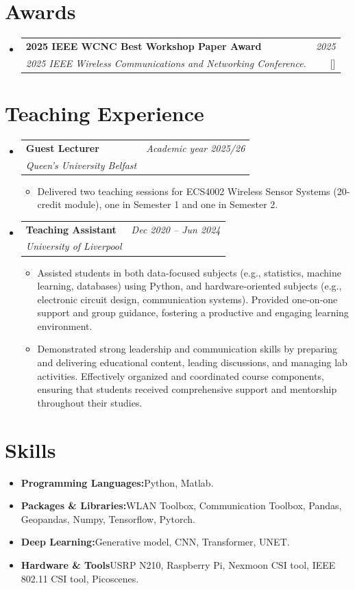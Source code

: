 \documentclass[a4paper,11pt]{article}
\makeatletter
\newcommand{\resumeItem}[2]{
  \item{
    \textbf{#1}{\hspace{0.5mm}#2 \vspace{-0.5mm}}
  }
}
\newcommand{\resumeProject}[4]{
\vspace{0.5mm}\item
    \begin{tabular*}{0.98\textwidth}[t]{l@{\extracolsep{\fill}}r}
        \textbf{#1} & \textit{\footnotesize{#3}} \\
        \footnotesize{\textit{#2}} & \footnotesize{#4}
    \end{tabular*}
    \vspace{-2.4mm}
}
\newcommand{\resumeSubItem}[2]{\resumeItem{#1}{#2}\vspace{-4pt}}
\newcommand{\resumeSubHeadingListStart}{\begin{itemize}[leftmargin=*,labelsep=1mm]}
\newcommand{\resumeHeadingSkillStart}{\begin{itemize}[leftmargin=*,itemsep=1.7mm, rightmargin=2ex]}
\newcommand{\resumeItemListStart}{\begin{itemize}[leftmargin=*,labelsep=1mm,itemsep=0.5mm]}
\newcommand{\resumeSubHeadingListEnd}{\end{itemize}\vspace{2mm}}
\newcommand{\resumeHeadingSkillEnd}{\end{itemize}\vspace{-2mm}}
\newcommand{\resumeItemListEnd}{\end{itemize}\vspace{-2mm}}
\makeatother
\begin{document}
\section{\textbf{Awards}}
\vspace{-0.8mm}
\resumeSubHeadingListStart
\resumeProject
  {2025 IEEE WCNC Best Workshop Paper Award}
  {2025 IEEE Wireless Communications and Networking Conference.}
  {2025}
  {{}[\href{https://wcnc2025.ieee-wcnc.org/program-0/program-glance/best-paper-awards}
  {\textcolor{darkblue}{\faIcon{globe}}}]
  }
\resumeSubHeadingListEnd


\section{\textbf{Teaching Experience}}
\resumeSubHeadingListStart
\resumeProject
  {Guest Lecturer}
  {Queen's University Belfast}
  {Academic year 2025/26}
  {}
\resumeItemListStart
\item Delivered two teaching sessions for ECS4002 Wireless Sensor Systems (20-credit module), one in Semester 1 and one in Semester 2.
\resumeItemListEnd

\resumeProject
  {Teaching Assistant}
  {University of Liverpool}
  {Dec 2020 -- Jun 2024}
  {}
\resumeItemListStart
\item Assisted students in both data-focused subjects (e.g., statistics, machine learning, databases) using Python, and hardware-oriented subjects (e.g., electronic circuit design, communication systems). Provided one-on-one support and group guidance, fostering a productive and engaging learning environment.

\item Demonstrated strong leadership and communication skills by preparing and delivering educational content, leading discussions, and managing lab activities. Effectively organized and coordinated course components, ensuring that students received comprehensive support and mentorship throughout their studies.
\resumeItemListEnd

\resumeSubHeadingListEnd




\section{\textbf{Skills}}
\vspace{-0.4mm}
 \resumeHeadingSkillStart
    \resumeSubItem{Programming Languages:}{Python, Matlab.}
    \resumeSubItem{Packages \& Libraries:}{WLAN Toolbox, Communication Toolbox, Pandas, Geopandas, Numpy, Tensorflow, Pytorch.}
    \resumeSubItem{Deep Learning:}{Generative model, CNN, Transformer, UNET.}
    \resumeSubItem{Hardware \& Tools}{USRP N210, Raspberry Pi, Nexmoon CSI tool, IEEE 802.11 CSI tool, Picoscenes.}

 \resumeHeadingSkillEnd
\end{document}
